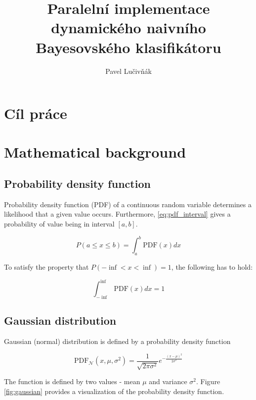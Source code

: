 \documentclass[thesis=B,english]{FITthesis}[2012/06/26]
\title{Paralelní implementace dynamického naivního Bayesovského klasifikátoru}
\author{Pavel Lučivňák} %
\begin{document}

\begin{introduction}
\end{introduction}

\chapter{Cíl práce}

\chapter{Mathematical background}

\section{Probability density function}

Probability density function (PDF) of a continuous random variable determines a likelihood that a given value occurs. Furthermore, \ref{eq:pdf_interval} gives a probability of value being in interval $[a,b]$.

\begin{equation} \label{eq:pdf_interval}
P(a \leq x \leq b) = \int_a^b \text{PDF}(x) dx
\end{equation}

To satisfy the property that $P(-\inf < x < \inf) = 1$, the following has to hold:

\begin{equation}
\int_{-\inf}^{\inf} \text{PDF}(x) dx = 1
\end{equation}

\section{Gaussian distribution}

Gaussian (normal) distribution is defined by a probability density function

\begin{equation} \label{eq:gaussian_pdf}
\text{PDF}_\mathcal{N}(x,\mu,\sigma^2) = \frac{1}{\sqrt{2 \pi \sigma^2}}e^{-\frac{(x-\mu)^2}{2 \sigma^2}}
\end{equation}

The function is defined by two values - mean $\mu$ and variance $\sigma^2$. Figure \ref{fig:gaussian} provides a visualization of the probability density function.
\end{document}

